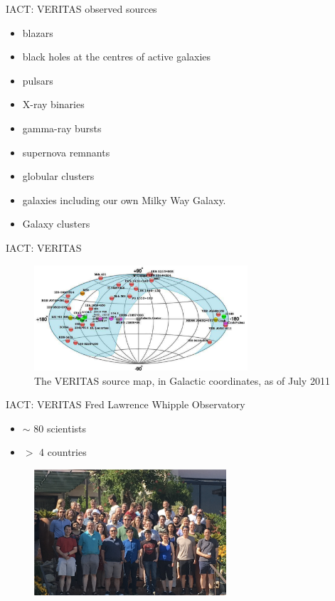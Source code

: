 \documentclass{beamer}
\begin{document}
\begin{frame}{IACT: VERITAS}
    observed sources
    \begin{itemize}
        \item blazars
        \item black holes at the centres of active galaxies
        \item pulsars
        \item X-ray binaries
        \item gamma-ray bursts
        \item supernova remnants
        \item globular clusters
        \item galaxies including our own Milky Way Galaxy.
        \item Galaxy clusters
    \end{itemize}
\end{frame}


\begin{frame}{IACT: VERITAS}
    \begin{figure}[h]
        \includegraphics[width=300px]{VERITAS_source_map.png}
        \caption{The VERITAS source map, in Galactic coordinates, as of July 2011}
    \end{figure}
\end{frame}


\begin{frame}{IACT: VERITAS}
    Fred Lawrence Whipple Observatory
    \begin{itemize}
        \item $\sim$ 80 scientists
        \item $>$ 4 countries
    \end{itemize}
    \begin{figure}[h]
        \includegraphics[width=270px]{VERITAS_collaboration.png}
    \end{figure}
\end{frame}
\end{document}
